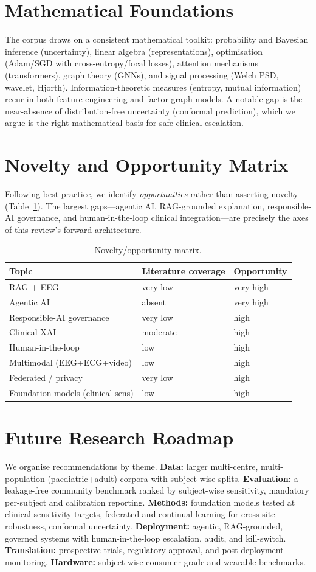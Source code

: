 \section{Mathematical Foundations}
The corpus draws on a consistent mathematical toolkit: probability and Bayesian inference (uncertainty), linear algebra (representations), optimisation (Adam/SGD with cross-entropy/focal losses), attention mechanisms (transformers), graph theory (GNNs), and signal processing (Welch PSD, wavelet, Hjorth). Information-theoretic measures (entropy, mutual information) recur in both feature engineering and factor-graph models. A notable gap is the near-absence of distribution-free uncertainty (conformal prediction), which we argue is the right mathematical basis for safe clinical escalation.

\section{Novelty and Opportunity Matrix}
Following best practice, we identify \emph{opportunities} rather than asserting novelty (Table~\ref{tab:nov}). The largest gaps---agentic AI, RAG-grounded explanation, responsible-AI governance, and human-in-the-loop clinical integration---are precisely the axes of this review's forward architecture.
\begin{table}[t]\centering\caption{Novelty/opportunity matrix.}\label{tab:nov}
\footnotesize\begin{tabular}{lll}\toprule
Topic & Literature coverage & Opportunity\\\midrule
RAG + EEG & very low & very high\\
Agentic AI & absent & very high\\
Responsible-AI governance & very low & high\\
Clinical XAI & moderate & high\\
Human-in-the-loop & low & high\\
Multimodal (EEG+ECG+video) & low & high\\
Federated / privacy & very low & high\\
Foundation models (clinical sens) & low & high\\\bottomrule
\end{tabular}\end{table}

\section{Future Research Roadmap}
We organise recommendations by theme. \textbf{Data:} larger multi-centre, multi-population (paediatric+adult) corpora with subject-wise splits. \textbf{Evaluation:} a leakage-free community benchmark ranked by subject-wise sensitivity, mandatory per-subject and calibration reporting. \textbf{Methods:} foundation models tested at clinical sensitivity targets, federated and continual learning for cross-site robustness, conformal uncertainty. \textbf{Deployment:} agentic, RAG-grounded, governed systems with human-in-the-loop escalation, audit, and kill-switch. \textbf{Translation:} prospective trials, regulatory approval, and post-deployment monitoring. \textbf{Hardware:} subject-wise consumer-grade and wearable benchmarks.


